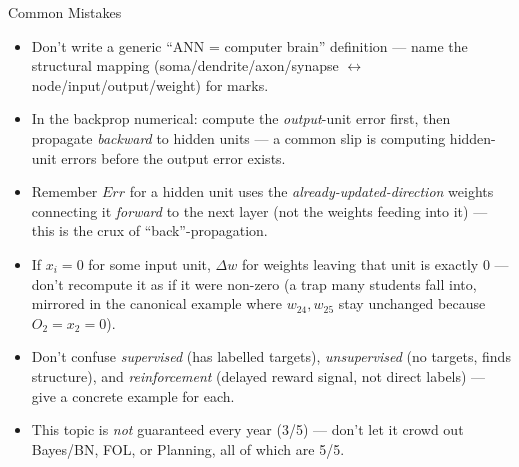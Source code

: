 \documentclass[12pt,a4paper]{article}
\begin{document}
\begin{warnbox}{Common Mistakes}
\begin{itemize}[noitemsep]
  \item Don't write a generic ``ANN = computer brain'' definition --- name the structural mapping (soma/dendrite/axon/synapse $\leftrightarrow$ node/input/output/weight) for marks.
  \item In the backprop numerical: compute the \emph{output}-unit error first, then propagate \emph{backward} to hidden units --- a common slip is computing hidden-unit errors before the output error exists.
  \item Remember $Err$ for a hidden unit uses the \emph{already-updated-direction} weights connecting it \emph{forward} to the next layer (not the weights feeding into it) --- this is the crux of ``back''-propagation.
  \item If $x_i = 0$ for some input unit, $\Delta w$ for weights leaving that unit is exactly $0$ --- don't recompute it as if it were non-zero (a trap many students fall into, mirrored in the canonical example where $w_{24}, w_{25}$ stay unchanged because $O_2 = x_2 = 0$).
  \item Don't confuse \emph{supervised} (has labelled targets), \emph{unsupervised} (no targets, finds structure), and \emph{reinforcement} (delayed reward signal, not direct labels) --- give a concrete example for each.
  \item This topic is \emph{not} guaranteed every year (3/5) --- don't let it crowd out Bayes/BN, FOL, or Planning, all of which are 5/5.
\end{itemize}
\end{warnbox}
\end{document}
